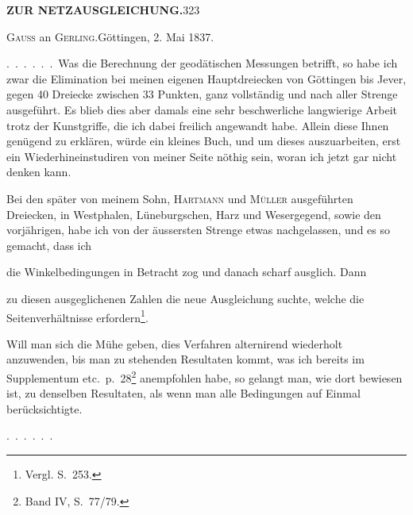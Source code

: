 \noindent\textbf{ZUR NETZAUSGLEICHUNG.}\hfill323
\begin{center}\textsc{Gauss} an \textsc{Gerling}.\quad Göttingen, 2. Mai 1837.\end{center}

.\ .\ .\ .\ .\ .\ Was die Berechnung der geodätischen Messungen betrifft, so
habe ich zwar die Elimination bei meinen eigenen Hauptdreiecken von Göttingen
bis Jever, gegen 40 Dreiecke zwischen 33 Punkten, ganz vollständig und
nach aller Strenge ausgeführt. Es blieb dies aber damals eine sehr beschwerliche
langwierige Arbeit trotz der Kunstgriffe, die ich dabei freilich angewandt
habe. Allein diese Ihnen genügend zu erklären, würde ein kleines Buch, und
um dieses auszuarbeiten, erst ein Wiederhineinstudiren von meiner Seite nöthig
sein, woran ich jetzt gar nicht denken kann.

\begingroup
\def\letterfourstars{*}
\makeatletter
\renewcommand{\@makefnmark}{\hbox{\normalfont[\textsuperscript{\letterfourstars})]}}
\renewcommand{\@makefntext}[1]{\parindent1em\noindent\hbox to2em{\hss[\textsuperscript{\letterfourstars})\ }#1]}
\makeatother
Bei den später von meinem Sohn, \textsc{Hartmann} und \textsc{Müller} ausgeführten
Dreiecken, in Westphalen, Lüneburgschen, Harz und Wesergegend, sowie
den vorjährigen, habe ich von der äussersten Strenge etwas nachgelassen, und
es so gemacht, dass ich
\begin{list}{}{\setlength{\leftmargin}{2.4em}\setlength{\labelwidth}{1.5em}\setlength{\labelsep}{.5em}\setlength{\itemsep}{.3em}\setlength{\topsep}{.3em}}
\item[1)] die Winkelbedingungen  in Betracht zog und danach scharf ausglich. Dann
\item[2)] zu diesen ausgeglichenen Zahlen die neue Ausgleichung suchte, welche
die Seitenverhältnisse erfordern\footnote{Vergl. S.\ 253.}.
\end{list}
\def\letterfourstars{**}
\par\noindent\hspace*{\parindent}Will man sich die Mühe geben, dies Verfahren alternirend wiederholt
anzuwenden, bis man zu stehenden Resultaten kommt, was ich bereits im
Supplementum etc.\ p.\ 28\footnote{Band IV, S.\ 77/79.} anempfohlen habe, so gelangt man, wie dort
bewiesen ist,  zu denselben Resultaten, als wenn man alle Bedingungen
auf Einmal berücksichtigte.
\par\medskip
.\ .\ .\ .\ .\ .
\endgroup

